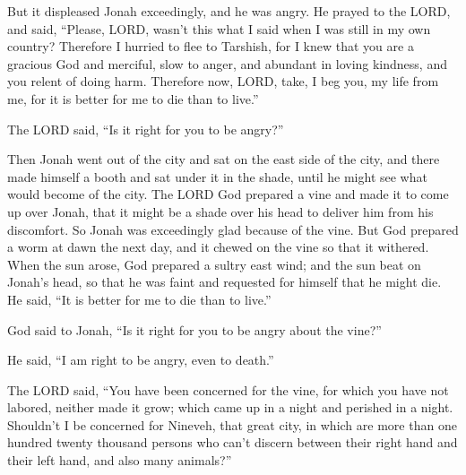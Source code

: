 \mychapter{} \myverse*{}But it displeased Jonah exceedingly, and he was angry.
\myverse{}He prayed to the LORD, and said, “Please, LORD, wasn’t this what I said when
I was still in my own country? Therefore I hurried to flee to Tarshish, for I knew that you are a gracious
God and merciful, slow to anger, and abundant in loving kindness, and you relent of doing harm.
\myverse{}Therefore now, LORD, take, I beg you, my life from me, for it is better for
me to die than to live.”

\myverse{}The LORD said, “Is it right for you to be angry?”

\myverse{}Then Jonah went out of the city and sat on the east side of the
city, and there made himself a booth and sat under it in the shade, until he might see what would become
of the city.
\myverse{}The LORD God prepared a vine and made it to come up over Jonah, that it might
be a shade over his head to deliver him from his discomfort. So Jonah was exceedingly glad because of
the vine.
\myverse{}But God prepared a worm at dawn the next day, and it chewed on the vine so that
it withered.
\myverse{}When the sun arose, God prepared a sultry east wind; and the sun beat on Jonah’s
head, so that he was faint and requested for himself that he might die. He said, “It is better for me
to die than to live.”

\myverse{}God said to Jonah, “Is it right for you to be angry about the vine?”

He said, “I am right to be angry, even to death.”

\myverse{}The LORD said, “You have been concerned for the vine, for which
you have not labored, neither made it grow; which came up in a night and perished in a night.
\myverse{}Shouldn’t I be concerned for Nineveh, that great city, in which are more than
one hundred twenty thousand persons who can’t discern between their right hand and their left hand, and
also many animals?”



